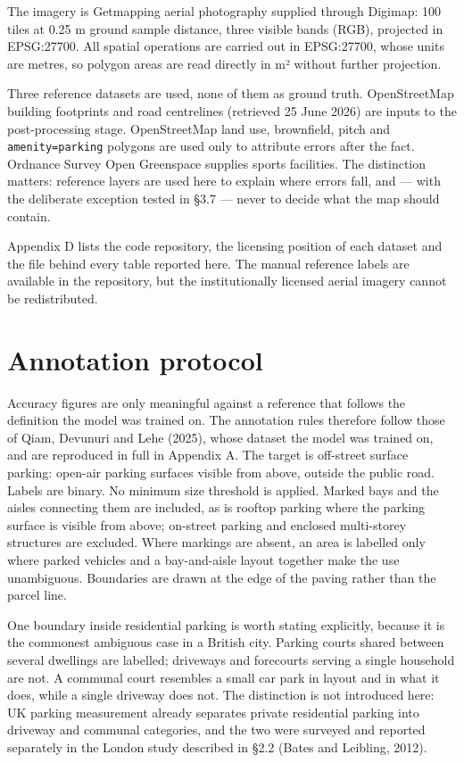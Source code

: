 The imagery is Getmapping aerial photography supplied through Digimap: 100 tiles at 0.25 m ground sample distance, three visible bands (RGB), projected in EPSG:27700. All spatial operations are carried out in EPSG:27700, whose units are metres, so polygon areas are read directly in m² without further projection.

Three reference datasets are used, none of them as ground truth. OpenStreetMap building footprints and road centrelines (retrieved 25 June 2026) are inputs to the post-processing stage. OpenStreetMap land use, brownfield, pitch and \texttt{amenity=parking} polygons are used only to attribute errors after the fact. Ordnance Survey Open Greenspace supplies sports facilities. The distinction matters: reference layers are used here to explain where errors fall, and --- with the deliberate exception tested in §3.7 --- never to decide what the map should contain.

Appendix D lists the code repository, the licensing position of each dataset and the file behind every table reported here. The manual reference labels are available in the repository, but the institutionally licensed aerial imagery cannot be redistributed.

\hypertarget{annotation-protocol}{%
\section{Annotation protocol}\label{annotation-protocol}}

Accuracy figures are only meaningful against a reference that follows the definition the model was trained on. The annotation rules therefore follow those of Qiam, Devunuri and Lehe (2025), whose dataset the model was trained on, and are reproduced in full in Appendix A. The target is off-street surface parking: open-air parking surfaces visible from above, outside the public road. Labels are binary. No minimum size threshold is applied. Marked bays and the aisles connecting them are included, as is rooftop parking where the parking surface is visible from above; on-street parking and enclosed multi-storey structures are excluded. Where markings are absent, an area is labelled only where parked vehicles and a bay-and-aisle layout together make the use unambiguous. Boundaries are drawn at the edge of the paving rather than the parcel line.

One boundary inside residential parking is worth stating explicitly, because it is the commonest ambiguous case in a British city. Parking courts shared between several dwellings are labelled; driveways and forecourts serving a single household are not. A communal court resembles a small car park in layout and in what it does, while a single driveway does not. The distinction is not introduced here: UK parking measurement already separates private residential parking into driveway and communal categories, and the two were surveyed and reported separately in the London study described in §2.2 (Bates and Leibling, 2012).

